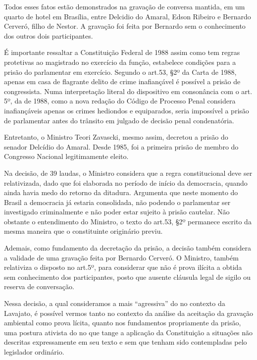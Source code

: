 Todos esses fatos estão demonstrados na gravação de conversa mantida, em
um quarto de hotel em Brasília, entre Delcidio do Amaral, Edson Ribeiro
e Bernardo Cerveró, filho de Nestor. A gravação foi feita por Bernardo
sem o conhecimento dos outros dois participantes.

É importante ressaltar a Constituição Federal de 1988 assim como tem
regras protetivas ao magistrado no exercício da função, estabelece
condições para a prisão do parlamentar em exercício. Segundo o art.53,
§2º da Carta de 1988, apenas em casa de flagrante delito de crime
inafiançável é possível a prisão de congressista. Numa interpretação
literal do dispositivo em consonância com o art. 5º,  da  de 1988,
como a nova redação do Código de Processo Penal considera inafiançáveis
apenas os crimes hediondos e equiparados, seria impossível a prisão de
parlamentar antes do trânsito em julgado de decisão penal condenatória.

Entretanto, o Ministro Teori Zavascki, mesmo assim, decretou a prisão do
senador Delcídio do Amaral. Desde 1985, foi a primeira prisão de membro
do Congresso Nacional legitimamente eleito.

Na decisão, de 39 laudas, o Ministro considera que a regra
constitucional deve ser relativizada, dado que foi elaborada no período
de início da democracia, quando ainda havia medo do retorno da ditadura.
Argumenta que neste momento do Brasil a democracia já estaria
consolidada, não podendo o parlamentar ser investigado criminalmente e
não poder estar sujeito à prisão cautelar. Não obstante o entendimento
do Ministro, o texto do art.53, §2º permanece escrito da mesma maneira
que o constituinte originário previu.

Ademais, como fundamento da decretação da prisão, a decisão também
considera a validade de uma gravação feita por Bernardo Cerveró. O
Ministro, também relativiza o disposto no art.5º,  para considerar
que não é prova ilícita a obtida sem conhecimento dos participantes,
posto que ausente cláusula legal de sigilo ou reserva de conversação.

Nessa decisão, a qual consideramos a mais ``agressiva'' do  no
contexto da Lavajato, é possível vermos tanto no contexto da análise da
aceitação da gravação ambiental como prova lícita, quanto nos
fundamentos propriamente da prisão, uma postura ativista do  no que
tange a aplicação da Constituição a situações não descritas
expressamente em seu texto e sem que tenham sido contempladas pelo
legislador ordinário.


